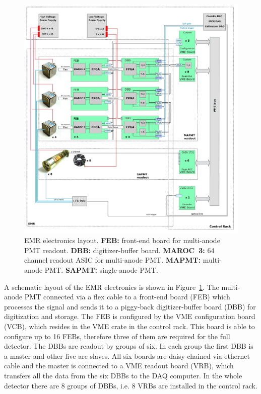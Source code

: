 \documentclass[a4paper,11pt]{article}
\begin{document}
\begin{figure}[htp!]
 \centering
 \includegraphics[width=\textwidth]{./EMR_electronics_layout}
 \caption[EMR electronics layout.]{EMR electronics layout. {\bf FEB:} front-end board for multi-anode PMT readout. {\bf DBB:} digitizer-buffer
 board. {\bf MAROC~3:} 64 channel readout ASIC for multi-anode PMT. {\bf MAPMT:} multi-anode PMT. {\bf SAPMT:} single-anode PMT.}
 \label{fig:EMR_electronics_layout}
\end{figure}

A schematic layout of the EMR electronics is shown in Figure~\ref{fig:EMR_electronics_layout}. The multi-anode PMT connected via a flex cable
to a front-end board (FEB) which processes the signal and sends it to a piggy-back digitizer-buffer board (DBB) for digitization and storage.
The FEB is configured by the VME configuration board (VCB), which resides in the VME crate in the control rack. This board is able to configure
up to 16 FEBs, therefore three of them are required for the full detector. The DBBs are readout by groups of six. In each group the first DBB
is a master and other five are slaves. All six boards are daisy-chained via ethernet cable and the master is connected to a VME readout board
(VRB), which transfers all the data from the six DBBs to the DAQ computer. In the whole detector there are 8 groups of DBBs, i.e. 8 VRBs are
installed in the control rack. 
\end{document}
